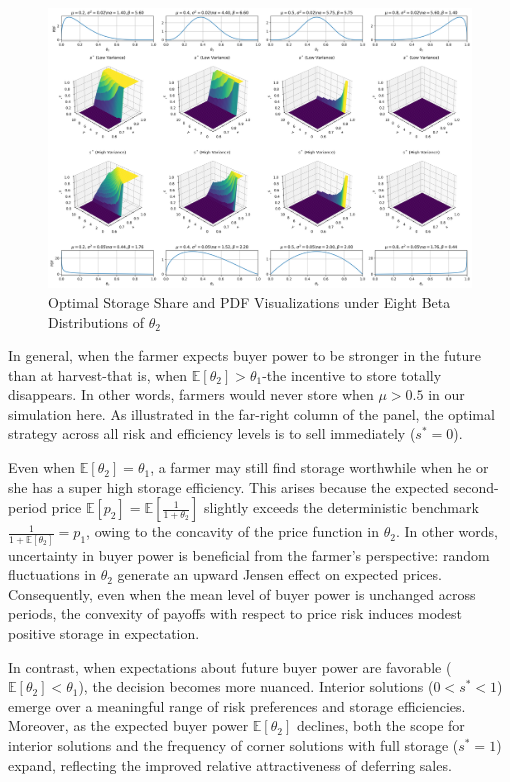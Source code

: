 \begin{figure}[ht!]
\centering
\includegraphics[width=\textwidth]{model_figures/3D_formulation.png}
\caption{Optimal Storage Share and PDF Visualizations under Eight Beta Distributions of $\theta_2$}
\label{Figure:3D_formulation}
\end{figure}

In general, when the farmer expects buyer power to be stronger in the future than at harvest-that is, when $\mathbb{E}[\theta_2] > \theta_1$-the incentive to store totally disappears. In other words, farmers would never store when $\mu > 0.5$ in our simulation here. As illustrated in the far-right column of the panel, the optimal strategy across all risk and efficiency levels is to sell immediately ($s^* = 0$).

Even when $\mathbb{E}[\theta_2] = \theta_1$, a farmer may still find storage worthwhile when he or she has a super high storage efficiency. This arises because the expected second-period price $\mathbb{E}[p_2] = \mathbb{E}\!\left[\frac{1}{1+\theta_2}\right]$ slightly exceeds the deterministic benchmark $\frac{1}{1+\mathbb{E}[\theta_2]} = p_1$, owing to the concavity of the price function in $\theta_2$. In other words, uncertainty in buyer power is beneficial from the farmer's perspective: random fluctuations in $\theta_2$ generate an upward Jensen effect on expected prices. Consequently, even when the mean level of buyer power is unchanged across periods, the convexity of payoffs with respect to price risk induces modest positive storage in expectation.

In contrast, when expectations about future buyer power are favorable ($\mathbb{E}[\theta_2] < \theta_1$), the decision becomes more nuanced. Interior solutions ($0 < s^* < 1$) emerge over a meaningful range of risk preferences and storage efficiencies. Moreover, as the expected buyer power $\mathbb{E}[\theta_2]$ declines, both the scope for interior solutions and the frequency of corner solutions with full storage ($s^* = 1$) expand, reflecting the improved relative attractiveness of deferring sales.



